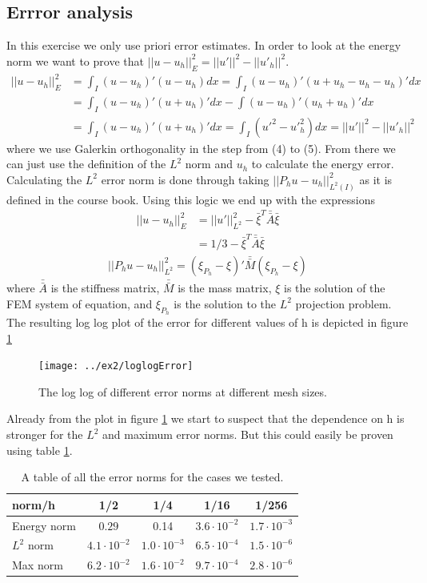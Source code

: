 \documentclass[11pt]{article}
\begin{document}
\subsection{Errror analysis}
In this exercise we only use priori error estimates. In order to look at the energy norm we want to prove that $||u - u_h||^2_E = ||u'||^2 - ||{u'}_h||^2$. 
\begin{align}
	||u-u_h||^2_E &= \int_I (u-u_h)'(u-u_h)dx = \int_I (u-u_h)'(u+u_h-u_h-u_h)'dx \\
	&= \int_I (u-u_h)'(u+u_h)'dx -  \int(u-u_h)'(u_h+u_h)'dx \\
	&= \int_I (u-u_h)'(u+u_h)'dx = \int_I ({u'}^2 - {u'}^2_h)dx =  ||u'||^2 - ||{u'}_h||^2 
\end{align}
where we use Galerkin orthogonality in the step from (4) to (5). From there we can just use the definition of the $L^2$ norm and $u_h$ to calculate the energy error. Calculating the $L^2$ error norm is done through taking $||P_hu - u_h||^2_{L^2(I)}$ as it is defined in the course book. Using this logic we end up with the expressions
\begin{align}
	||u - u_h||^2_E &= ||u'||^2_{L^2} - \bar{\xi}^T \bar{\bar{A}} \bar{\xi} \\
	&= 1/3 - \bar{\xi}^T \bar{\bar{A}} \bar{\xi}
\end{align}
\begin{align}
	||P_hu - u_h||^2_{L^2} = (\xi_{P_h} - \xi)' \bar{\bar{M}} (\xi_{P_h} - \xi)
\end{align}
where $\bar{\bar{A}}$ is the stiffness matrix, $\bar{\bar{M}}$ is the mass matrix, $\xi$ is the solution of the FEM system of equation, and $\xi_{P_h}$ is the solution to the $L^2$ projection problem.  The resulting log log plot of the error for different values of h is depicted in figure \ref{fig:loglogError}
\begin{figure}[H]
	\centering
	\texttt{[image: ../ex2/loglogError]}
	\caption{The log log of different error norms at different mesh sizes.}
	\label{fig:loglogError}
\end{figure}
Already from the plot in figure \ref{fig:loglogError} we start to suspect that the dependence on h is stronger for the $L^2$ and maximum error norms. But this could easily be proven using table \ref{table:errors}. 
\begin{table}[H]
	\center
	\begin{tabular}{l | c c c c}
		norm/h & 1/2 & 1/4 & 1/16 & 1/256 \\
		\hline 
		Energy norm & $ 0.29$ & 0.14 & $3.6\cdot10^{-2}$ & $1.7\cdot10^{-3}$ \\
		$L^2$ norm & $4.1\cdot10^{-2}$ & $1.0\cdot10^{-3}$ & $6.5\cdot10^{-4}$ & $1.5\cdot10^{-6}$ \\
		Max norm & $6.2\cdot10^{-2}$ & $1.6\cdot10^{-2}$ & $9.7\cdot 10^{-4}$ & $2.8\cdot10^{-6}$
	\end{tabular}
	\caption{A table of all the error norms for the cases we tested.}
	\label{table:errors}
\end{table}
\end{document}
